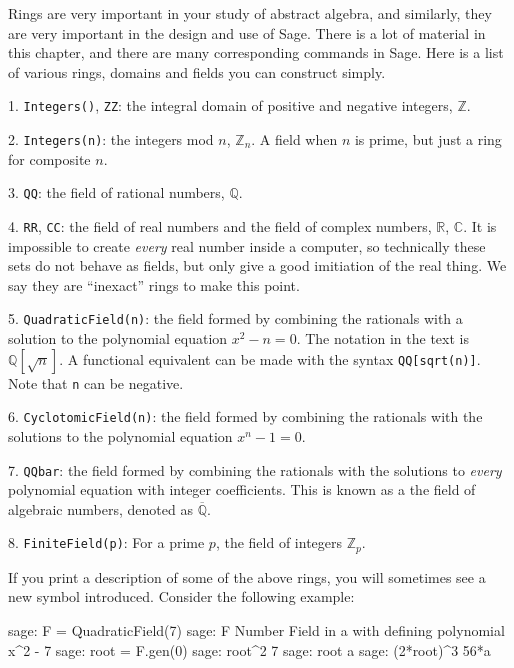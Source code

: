 Rings are very important in your study of abstract algebra, and similarly, they are very important in the design and use of Sage.  There is a lot of material in this chapter, and there are many corresponding commands in Sage.
%
%
Here is a list of various rings, domains and fields you can construct simply.\par
%
1. \verb?Integers()?, \verb?ZZ?: the integral domain of positive and negative integers, ${\mathbb Z}$.\par
%
2.  \verb?Integers(n)?: the integers mod $n$, ${\mathbb Z_n}$.  A field when $n$ is prime, but just a ring for composite $n$.\par
%
3.  \verb?QQ?: the field of rational numbers, ${\mathbb Q}$.\par
%
4.  \verb?RR?, \verb?CC?: the field of real numbers and the field of complex numbers, ${\mathbb R}$, ${\mathbb C}$.  It is impossible to create \emph{every} real number inside a computer, so technically these sets do not behave as fields, but only give a good imitiation of the real thing.  We say they are ``inexact'' rings to make this point.\par
%
5.  \verb?QuadraticField(n)?:  the field formed by combining the rationals with a solution to the polynomial equation $x^2-n=0$.  The notation in the text is ${\mathbb Q}[\sqrt{n}]$.  A functional equivalent can be made with the syntax \verb?QQ[sqrt(n)]?.  Note that \verb?n? can be negative.\par
%
6.  \verb?CyclotomicField(n)?: the field formed by combining the rationals with the solutions to the polynomial equation $x^n-1=0$.\par
%
7.  \verb?QQbar?: the field formed by combining the rationals with the solutions to \emph{every} polynomial equation with integer coefficients.  This is known as a the field of algebraic numbers, denoted as $\overline{{\mathbb Q}}$.\par
%
8.  \verb?FiniteField(p)?: For a prime $p$, the field of integers ${\mathbb Z_p}$.\par
%
If you print a description of some of the above rings, you will sometimes see a new symbol introduced.  Consider the following example:
%
\begin{sageexample}
sage: F = QuadraticField(7)
sage: F
Number Field in a with defining polynomial x^2 - 7
sage: root = F.gen(0)
sage: root^2
7
sage: root
a
sage: (2*root)^3
56*a
\end{sageexample}
